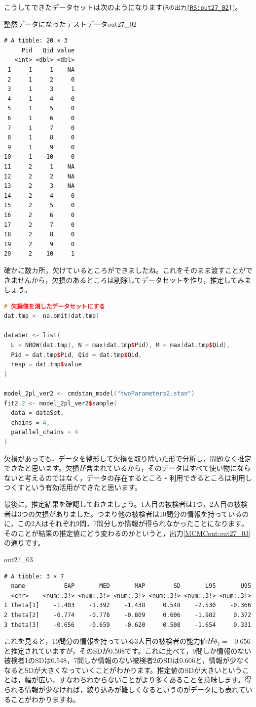 \documentclass{ltjsbook}
\begin{document}
こうしてできたデータセットは次のようになります(\texttt{Rの出力\ref{RS:out27_02}})。
\begin{Rscreen}{整然データになったテストデータ}{out27_02}
  \begin{verbatim}
# A tibble: 20 × 3
     Pid   Qid value
   <int> <dbl> <dbl>
 1     1     1    NA
 2     1     2     0
 3     1     3     1
 4     1     4     0
 5     1     5     0
 6     1     6     0
 7     1     7     0
 8     1     8     0
 9     1     9     0
10     1    10     0
11     2     1    NA
12     2     2    NA
13     2     3    NA
14     2     4     0
15     2     5     0
16     2     6     0
17     2     7     0
18     2     8     0
19     2     9     0
20     2    10     1
    \end{verbatim}
\end{Rscreen}
確かに数カ所，欠けているところができましたね。これをそのまま渡すことができませんから，欠損のあるところは削除してデータセットを作り，推定してみましょう。
\begin{lstlisting}[language=c++,label={code:27_03},caption={データセットを作って推定する}]
# 欠損値を消したデータセットにする
dat.tmp <- na.omit(dat.tmp)

dataSet <- list(
  L = NROW(dat.tmp), N = max(dat.tmp$Pid), M = max(dat.tmp$Qid),
  Pid = dat.tmp$Pid, Qid = dat.tmp$Qid,
  resp = dat.tmp$value
)

model_2pl_ver2 <- cmdstan_model("twoParameters2.stan")
fit2.2 <- model_2pl_ver2$sample(
  data = dataSet,
  chains = 4,
  parallel_chains = 4
)
\end{lstlisting}
欠損があっても，データを整形して欠損を取り除いた形で分析し，問題なく推定できたと思います。欠損が含まれているから，そのデータはすべて使い物にならないと考えるのではなく，データの存在するところ・利用できるところは利用しつくすという有効活用ができたと思います。

最後に，推定結果を確認しておきましょう。1人目の被検者は1つ，2人目の被検者は3つの欠損がありました。つまり他の被検者は10問分の情報を持っているのに，この2人はそれぞれ9問，7問分しか情報が得られなかったことになります。
そのことが結果の推定値にどう変わるのかというと，出力\ref{MCMCout:out27_03}の通りです。
\begin{MCMCout}{}{out27_03}
\begin{verbatim}
# A tibble: 3 × 7
  name           EAP       MED       MAP        SD       L95       U95
  <chr>    <num:.3!> <num:.3!> <num:.3!> <num:.3!> <num:.3!> <num:.3!>
1 theta[1]    -1.403    -1.392    -1.438     0.548    -2.530    -0.366
2 theta[2]    -0.774    -0.778    -0.809     0.606    -1.982     0.372
3 theta[3]    -0.656    -0.659    -0.620     0.508    -1.654     0.331
\end{verbatim}
\end{MCMCout}
これを見ると，10問分の情報を持っている3人目の被検者の能力値が$\theta_3 = -0.656$と推定されていますが，そのSDが0.508です。これに比べて，9問しか情報のない被検者1のSDは0.548，7問しか情報のない被検者2のSDは0.606と，情報が少なくなるとSDが大きくなっていくことがわかります。推定値のSDが大きいということは，幅が広い，すなわちわからないことがより多くあることを意味します。得られる情報が少なければ，絞り込みが難しくなるというのがデータにも表れていることがわかりますね。
\end{document}
